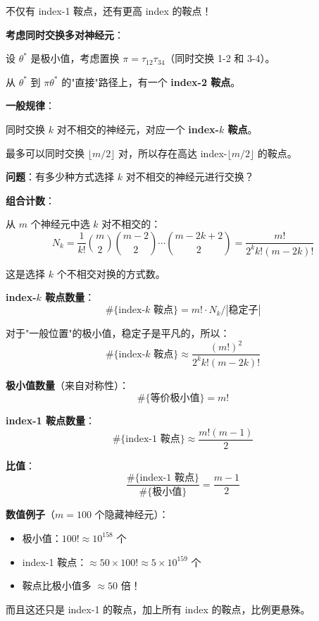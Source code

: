 \documentclass[12pt, a4paper]{ctexart}
\begin{document}
\begin{blackboard}

不仅有 index-1 鞍点，还有更高 index 的鞍点！

\textbf{考虑同时交换多对神经元}：

设 $\theta^*$ 是极小值，考虑置换 $\pi = \tau_{12} \tau_{34}$（同时交换 1-2 和 3-4）。

从 $\theta^*$ 到 $\pi\theta^*$ 的"直接"路径上，有一个 \textbf{index-2 鞍点}。

\textbf{一般规律}：

同时交换 $k$ 对不相交的神经元，对应一个 \textbf{index-$k$ 鞍点}。

最多可以同时交换 $\lfloor m/2 \rfloor$ 对，所以存在高达 index-$\lfloor m/2 \rfloor$ 的鞍点。

\end{blackboard}

\begin{blackboard}

\textbf{问题}：有多少种方式选择 $k$ 对不相交的神经元进行交换？

\textbf{组合计数}：

从 $m$ 个神经元中选 $k$ 对不相交的：
\[
N_k = \frac{1}{k!} \binom{m}{2} \binom{m-2}{2} \cdots \binom{m-2k+2}{2} = \frac{m!}{2^k k! (m-2k)!}
\]

这是选择 $k$ 个不相交对换的方式数。

\textbf{index-$k$ 鞍点数量}：
\[
\#\{\text{index-}k \text{ 鞍点}\} = m! \cdot N_k / |\text{稳定子}|
\]

对于"一般位置"的极小值，稳定子是平凡的，所以：
\[
\#\{\text{index-}k \text{ 鞍点}\} \approx \frac{(m!)^2}{2^k k! (m-2k)!}
\]

\end{blackboard}

\begin{keypoint}[鞍点 vs 极小值的数量对比]

\textbf{极小值数量}（来自对称性）：
\[
\#\{\text{等价极小值}\} = m!
\]

\textbf{index-1 鞍点数量}：
\[
\#\{\text{index-1 鞍点}\} \approx \frac{m!(m-1)}{2}
\]

\textbf{比值}：
\[
\frac{\#\{\text{index-1 鞍点}\}}{\#\{\text{极小值}\}} = \frac{m-1}{2}
\]

\textbf{数值例子}（$m = 100$ 个隐藏神经元）：
\begin{itemize}
    \item 极小值：$100! \approx 10^{158}$ 个
    \item index-1 鞍点：$\approx 50 \times 100! \approx 5 \times 10^{159}$ 个
    \item 鞍点比极小值多 $\approx 50$ 倍！
\end{itemize}

而且这还只是 index-1 的鞍点，加上所有 index 的鞍点，比例更悬殊。

\end{keypoint}
\end{document}
